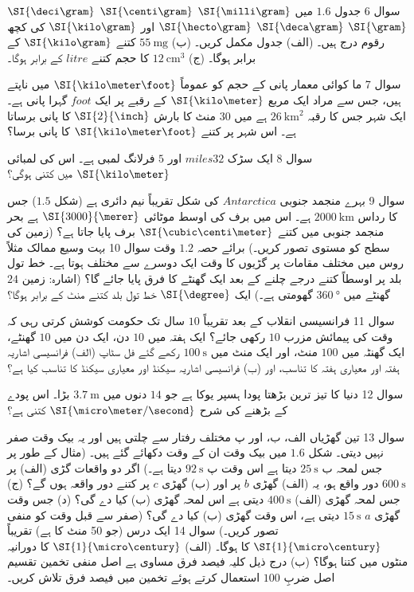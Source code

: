 سوال 6
جدول 
\(1.6\) 
میں 
\(\SI{\milli\gram}\)
 \(\SI{\centi\gram}\)
\(\SI{\deci\gram}\)
\(\SI{\gram}\)
\(\SI{\deca\gram}\)
\(\SI{\hecto\gram}\)
اور 
\(\SI{\kilo\gram}\)
کی کچھ رقوم درج ہیں۔ 
(الف) جدول مکمل کریں۔ 
(ب)
\(\SI{55}{\milli\gram}\) 
کتنے 
\(\SI{\kilo\gram}\)
کے برابر ہوگا۔ 
(ج) 
\(\SI{12}{\centi\meter\cubed}\)
کا حجم کتنے 
\(litre\)
کے برابر ہوگا۔ 

سوال 7 
ما کوائی معمار پانی کے حجم کو عموماً 
\(\SI{\kilo\meter\foot}\)
میں ناپتے ہیں، جس سے مراد ایک مربع
\(\SI{\kilo\meter}\)
کے رقبے پر ایک 
\(foot\)
گہرا پانی ہے۔ ایک شہر جس کا رقبہ 
\(\SI{26}{\kilo\meter\squared}\)
ہے میں 
\(30\)
منٹ کا بارش 
 \(\SI{2}{\inch}\)
کا پانی برساتا ہے۔ اس شہر پر کتنے
 \(\SI{\kilo\meter\foot}\)
کا پانی برسا؟ 

سوال 8 
ایک سڑک 
\(32\)\(miles\)
اور 
\(5\)
فرلانگ لمبی ہے۔ اس کی لمبائی 
\(\SI{\kilo\meter}\)
میں کتنی ہوگی؟ 

سوال 9 
بہرے منجمد جنوبی 
\(Antarctica\) 
کی شکل تقریباً نیم دائری ہے (شکل 
\(1.5\)) 
جس کا رداس 
 \(\SI{2000}{\kilo\meter}\)
ہے۔ اس میں برف کی اوسط موٹائی 
\(\SI{3000}{\merer}\) 
ہے بحر منجمد جنوبی میں کتنے 
\(\SI{\cubic\centi\meter}\)
برف پایا جاتا ہے؟ (زمین کی سطح کو مستوی تصور کریں۔)
برائے حصہ 
\(1.2\)
وقت 
سوال 10 بہت وسیع ممالک مثلاً روس میں مختلف مقامات پر گڑیوں کا وقت ایک دوسرے سے مختلف ہوتا ہے۔ خط تول بلد پر اوسطاً کتنے درجے چلنے کے بعد ایک گھنٹے کا فرق پایا جائے گا؟ (اشارہ: زمین 
\(24\)
گھنٹے میں 
\(\SI{360}{\degree}\)
گھومتی ہے۔) ایک 
 \(\SI{\degree}\)
خط تول بلد کتنے منٹ کے برابر ہوگا؟

سوال 11 
فرانسیسی انقلاب کے بعد تقریباً 
\(10\) 
سال تک حکومت کوشش کرتی رہی کہ وقت کی پیمائش مزرب 
\(10\)
رکھی جائے؟ ایک ہفتہ میں 
\(10\)
دن، ایک دن میں 
 \(10\)
گھنٹے، ایک گھنٹہ میں 
\(100\)
منٹ، اور ایک منٹ میں 
\(\SI{100}{\second}\)
رکھے گئے فل سٹاپ 
(الف) فرانسیسی اشاریہ ہفتہ اور معیاری ہفتہ کا تناسب، اور 
(ب) فرانسیسی اشاریہ سیکنڈ اور معیاری سیکنڈ کا تناسب کیا ہے؟ 

سوال 12 
دنیا کا تیز ترین بڑھتا پودا ہسپر یوکا ہے جو 
\(14\)
دنوں میں 
\(\SI{3.7}{\meter}\)
بڑا۔ اس پودے کے بڑھنے کی شرح 
\(\SI{\micro\meter/\second}\)
کتنی ہے؟ 

سوال 13 
تین گھڑیاں الف، ب، اور پ مختلف رفتار سے چلتی ہیں اور یہ بیک وقت صفر نہیں دیتی۔ شکل 
\(1.6\)
میں بیک وقت ان کے وقت دکھائے گئے ہیں۔ (مثال کے طور پر جس لمحہ ب 
\(\SI{25}{\second}\)
دیتا ہے اس وقت پ 
\(\SI{92}{\second}\)
دیتا ہے۔) اگر دو واقعات گڑی 
(الف) پر 
\(\SI{600}{\second}\)
دور واقع ہو، یہ (الف) گھڑی 
\(b\)
پر اور 
(ب) گھڑی 
\(c\)
پر کتنے دور واقعہ ہوں گے؟ 
(ج) جس لمحہ گھڑی 
(الف) 
\(\SI{400}{\second}\)
دیتی ہے اس لمحہ گھڑی 
(ب) کیا دے گی؟ 
(د) جس وقت گھڑی 
 \(a\)
 \(\SI{15}{\second}\)
دیتی ہے، اس وقت گھڑی (ب) کیا دے گی؟ (صفر سے قبل وقت کو منفی تصور کریں۔)
سوال 14 
ایک درس (جو 50 منٹ کا ہے) تقریباً 
\(\SI{1}{\micro\century}\)
کا ہوگا۔
(الف) 
 \(\SI{1}{\micro\century}\)
کا دورانیہ منٹوں میں کتنا ہوگا؟ 
(ب) درج ذیل کلیہ فیصد فرق مساوی ہے اصل منفی تخمین تقسیم اصل ضربِ 
\(100\)
استعمال کرتے ہوئے تخمین میں فیصد فرق تلاش کریں۔ 

